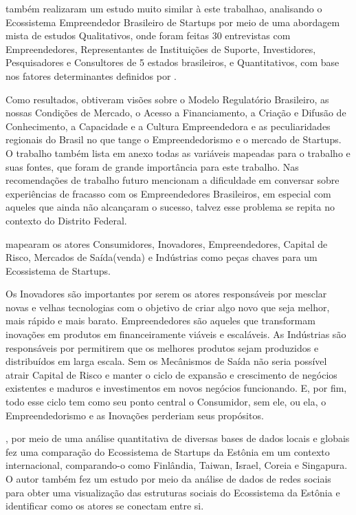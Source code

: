  também realizaram um estudo muito similar à este trabalhao, analisando o Ecossistema Empreendedor Brasileiro de Startups por meio de uma abordagem mista de estudos Qualitativos, onde foram feitas 30 entrevistas com Empreendedores, Representantes de Instituições de Suporte, Investidores, Pesquisadores e Consultores de 5 estados brasileiros, e Quantitativos, com base nos fatores determinantes definidos por . 

Como resultados, obtiveram visões sobre o Modelo Regulatório Brasileiro, as nossas Condições de Mercado, o Acesso a Financiamento, a Criação e Difusão de Conhecimento, a Capacidade e a Cultura Empreendedora e as peculiaridades regionais do Brasil no que tange o Empreendedorismo e o mercado de Startups. O trabalho também lista em anexo todas as variáveis mapeadas para o trabalho e suas fontes, que foram de grande importância para este trabalho. Nas recomendações de trabalho futuro mencionam a dificuldade em conversar sobre experiências de fracasso com os Empreendedores Brasileiros, em especial com aqueles que ainda não alcançaram o sucesso, talvez esse problema se repita no contexto do Distrito Federal.

 mapearam os atores Consumidores, Inovadores, Empreendedores, Capital de Risco, Mercados de Saída(venda) e Indústrias como peças chaves para um Ecossistema de Startups. 

Os Inovadores são importantes por serem os atores responsáveis por mesclar novas e velhas tecnologias com o objetivo de criar algo novo que seja melhor, mais rápido e mais barato. Empreendedores são aqueles que transformam inovações em produtos em financeiramente viáveis e escaláveis. As Indústrias são responsáveis por permitirem que os melhores produtos sejam produzidos e distribuídos em larga escala. Sem os Mecânismos de Saída não seria possível atrair Capital de Risco e manter o ciclo de expansão e crescimento de negócios existentes e maduros e investimentos em novos negócios funcionando. E, por fim, todo esse ciclo tem como seu ponto central o Consumidor, sem ele, ou ela, o Empreendedorismo e as Inovações perderiam seus propósitos.

, por meio de uma análise quantitativa de diversas bases de dados locais e globais fez uma comparação do Ecossistema de Startups da Estônia em um contexto internacional, comparando-o como Finlândia, Taiwan, Israel, Coreia e Singapura. O autor também fez um estudo por meio da análise de dados de redes sociais para obter uma visualização das estruturas sociais do Ecossistema da Estônia e identificar como os atores se conectam entre si.

